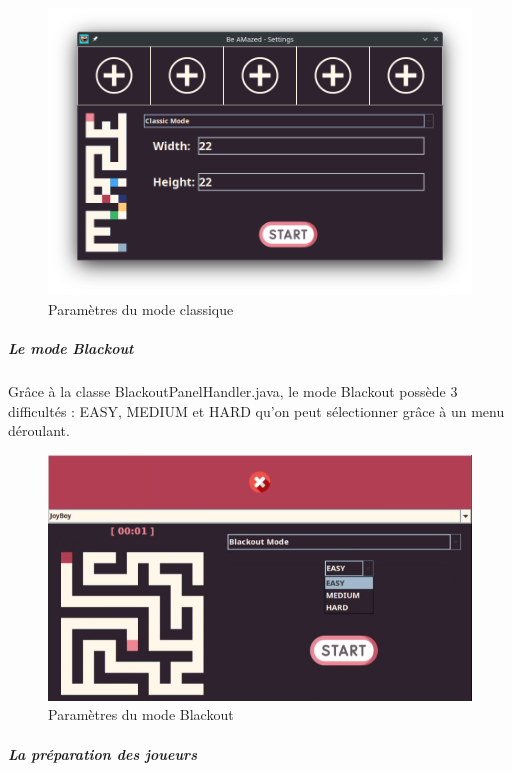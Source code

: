 \begin{figure}
    \centering
    \includegraphics[scale=0.5]{ressources/Implementation/Labyrinthe/Controleur/SettingsMenu_ClassicMode.png}
    \caption{Paramètres du mode classique}
    \label{fig:ClassicMode}
\end{figure}

\subparagraph*{Le mode Blackout}

Grâce à la classe BlackoutPanelHandler.java, le mode Blackout possède 3 difficultés : EASY, MEDIUM et HARD qu'on peut sélectionner grâce à un menu déroulant.

\begin{figure}
    \centering
    \includegraphics[scale=0.5]{ressources/Implementation/Labyrinthe/Controleur/SettingsMenu_BlackoutMode_Difficulty.png}
    \caption{Paramètres du mode Blackout}
    \label{fig:BlackoutModeDifficulty}
\end{figure}

\subparagraph*{La préparation des joueurs}

